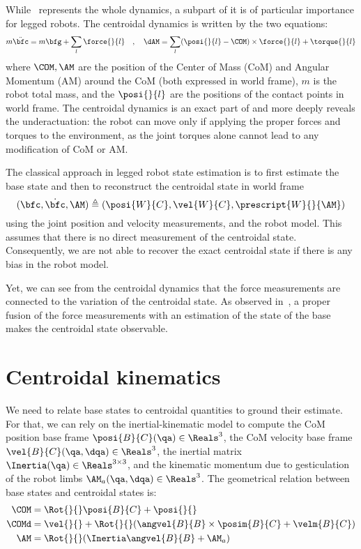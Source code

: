 While~ represents the whole dynamics, a subpart of it is of particular importance for legged robots.
The centroidal dynamics is written by the two equations:
%
\begin{equation}
    m \ddot{\bfc} = m \bfg + \sum_l \force{}{l} \quad , \quad
\dAM = \sum_l (\posi{}{l} - \COM) \times \force{}{l} + \torque{}{l}
\label{eq:NewtonEuler}
\end{equation}
%
where $\COM,\AM$ are the position of the Center of Mass (CoM) and Angular Momentum (AM) around the CoM (both expressed in world frame), $m$ is the robot total mass, 
and the $\posi{}{l}$ are the positions of the contact points in world frame. The centroidal dynamics is an exact part of  and more deeply reveals 
the underactuation: the robot can move only if applying the proper forces and torques to the environment, as the joint torques alone cannot lead to any modification 
of CoM or AM.

The classical approach in legged robot state estimation is to first estimate the base state and then to reconstruct the centroidal state in world frame
%
\begin{equation}
    (\bfc,\dot{\bfc},\AM) \triangleq (\posi{W}{C},\vel{W}{C},\prescript{W}{}{\AM})
\end{equation}
%
using the joint position and velocity measurements, and the robot model. This assumes that there is no direct measurement of the centroidal state.
Consequently, we are not able to recover the exact centroidal state if there is any bias in the robot model.

Yet, we can see from the centroidal dynamics that the force measurements are connected to the variation of the centroidal state.
As observed in~\cite{carpentier2016center}, a proper fusion of the force measurements with an estimation of the state of the base makes the centroidal state observable.



\section{Centroidal kinematics}
\label{sec:centroidal_kinematics}
%
We need to relate base states to centroidal quantities to ground their estimate. 
For that, we can rely on the inertial-kinematic model to compute the CoM position \wrt base frame $\posi{B}{C}(\qa) \in \Reals^3$, the CoM velocity \wrt 
base frame $\vel{B}{C}(\qa, \dqa) \in \Reals^3$, the inertial matrix $\Inertia(\qa) \in \Reals^{3\times 3}$, and the kinematic momentum due to gesticulation 
of the robot limbs $\AM_a(\qa, \dqa) \in \Reals^{3}$. The geometrical relation between base states and centroidal states is:
%
\begin{equation}
    \begin{split}
    \COM &= \Rot{}{} \posi{B}{C} + \posi{}{}
    \\
    \COMd &= 
    \vel{}{} + \Rot{}{}(\angvel{B}{B} \times \posim{B}{C} + \velm{B}{C})
    \\
    \AM &= \Rot{}{}(\Inertia \angvel{B}{B}+ \AM_a)
    \end{split}
\end{equation}



